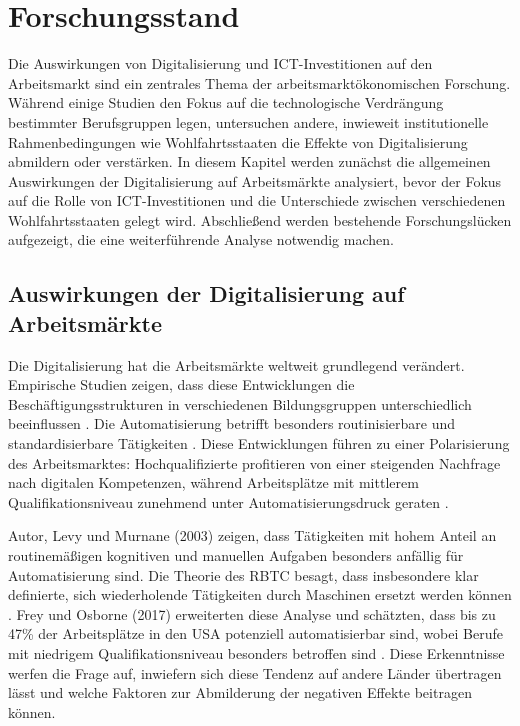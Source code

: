 
\section{Forschungsstand}

Die Auswirkungen von Digitalisierung und \ac{ICT}-Investitionen auf den Arbeitsmarkt sind
ein zentrales Thema der arbeitsmarktökonomischen Forschung. Während einige Studien den
Fokus auf die technologische Verdrängung bestimmter Berufsgruppen legen, untersuchen
andere, inwieweit institutionelle Rahmenbedingungen wie Wohlfahrtsstaaten die Effekte von
Digitalisierung abmildern oder verstärken. In diesem Kapitel werden zunächst die
allgemeinen Auswirkungen der Digitalisierung auf Arbeitsmärkte analysiert, bevor der Fokus
auf die Rolle von \ac{ICT}-Investitionen und die Unterschiede zwischen verschiedenen
Wohlfahrtsstaaten gelegt wird. Abschließend werden bestehende Forschungslücken aufgezeigt,
die eine weiterführende Analyse notwendig machen.


\subsection{Auswirkungen der Digitalisierung auf Arbeitsmärkte}

Die Digitalisierung hat die Arbeitsmärkte weltweit grundlegend verändert. Empirische 
Studien zeigen, dass diese Entwicklungen die Beschäftigungsstrukturen in verschiedenen 
Bildungsgruppen unterschiedlich beeinflussen \parencite[vgl.][S. 1589]{autor2013thegrowth}. 
Die Automatisierung betrifft besonders routinisierbare und standardisierbare Tätigkeiten 
\parencite[vgl.][S. 20]{frey2013thefuture}. Diese Entwicklungen führen zu einer 
Polarisierung des Arbeitsmarktes: Hochqualifizierte profitieren von einer steigenden 
Nachfrage nach digitalen Kompetenzen, während Arbeitsplätze mit mittlerem 
Qualifikationsniveau zunehmend unter Automatisierungsdruck geraten
\parencite[vgl.][S. 2509–2510]{goos2014explaining}.

Autor, Levy und Murnane (2003) zeigen, dass Tätigkeiten mit hohem Anteil an routinemäßigen
kognitiven und manuellen Aufgaben besonders anfällig für Automatisierung sind. Die Theorie
des \ac{RBTC} besagt, dass insbesondere klar definierte, sich wiederholende Tätigkeiten 
durch Maschinen ersetzt werden können \parencite[vgl.][S. 1281]{autor2003theskill}. Frey 
und Osborne (2017) erweiterten diese Analyse und schätzten, dass bis zu 47\% der 
Arbeitsplätze in den USA potenziell automatisierbar sind, wobei Berufe mit niedrigem 
Qualifikationsniveau besonders betroffen sind \parencite[S. 36–38]{frey2013thefuture}. 
Diese Erkenntnisse  werfen die Frage auf, inwiefern sich diese Tendenz auf andere Länder 
übertragen lässt und welche Faktoren zur Abmilderung der negativen Effekte beitragen 
können.

